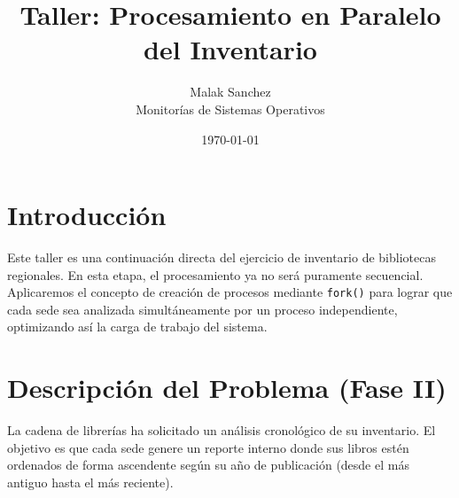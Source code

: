 \documentclass[12pt,a4paper]{article}
\title{\textbf{Taller: Procesamiento en Paralelo del Inventario}}
\author{Malak Sanchez \\ \small Monitorías de Sistemas Operativos}
\date{\today}
\begin{document}
\maketitle

\section*{Introducción}
Este taller es una continuación directa del ejercicio de inventario de bibliotecas regionales. En esta etapa, el procesamiento ya no será puramente secuencial. Aplicaremos el concepto de creación de procesos mediante \texttt{fork()} para lograr que cada sede sea analizada simultáneamente por un proceso independiente, optimizando así la carga de trabajo del sistema.

\section*{Descripción del Problema (Fase II)}
La cadena de librerías ha solicitado un análisis cronológico de su inventario. El objetivo es que cada sede genere un reporte interno donde sus libros estén ordenados de forma ascendente según su año de publicación (desde el más antiguo hasta el más reciente).
\end{document}
